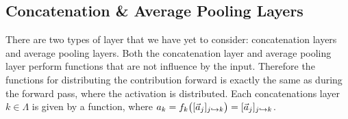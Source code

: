 



\subsection{Concatenation \& Average Pooling Layers}

There are two types of layer that we have yet to consider: concatenation layers and average pooling layers. Both the concatenation layer and average pooling layer perform functions that are not influence by the input. Therefore the functions for distributing the contribution forward is exactly the same as during the forward pass, where the activation is distributed. Each concatenations layer $k\in \Lambda$ is given by a function, where $a_k = f_k\big([\vec{a}_j]_{j\hookrightarrow k}\big) = [\vec{a}_j]_{j\hookrightarrow k}$. 

